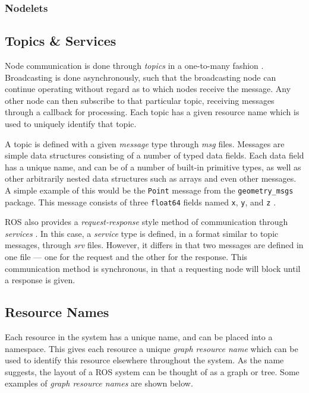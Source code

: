 \subsubsection{Nodelets}


\subsection{Topics \& Services}
Node communication is done through \emph{topics} in a one-to-many fashion \cite{ros_paper}. Broadcasting is done asynchronously, such that the broadcasting node can continue operating without regard as to which nodes receive the message. Any other node can then subscribe to that particular topic, receiving messages through a callback for processing. Each topic has a given resource name which is used to uniquely identify that topic.

A topic is defined with a given \emph{message} type through \emph{msg} files. Messages are simple data structures consisting of a number of typed data fields. Each data field has a unique name, and can be of a number of built-in primitive types, as well as other arbitrarily nested data structures such as arrays and even other messages. A simple example of this would be the \texttt{Point} message from the \texttt{geometry\_msgs} package. This message consists of three \texttt{float64} fields named \texttt{x}, \texttt{y}, and \texttt{z} \cite{ros_api_point_msg}.

ROS also provides a \emph{request-response} style method of communication through \emph{services} \cite{ros_wiki_services}. In this case, a \emph{service} type is defined, in a format similar to topic messages, through \emph{srv} files. However, it differs in that two messages are defined in one file --- one for the request and the other for the response. This communication method is synchronous, in that a requesting node will block until a response is given. 

\subsection{Resource Names}

Each resource in the system has a unique name, and can be placed into a namespace. This gives each resource a unique \emph{graph resource name} which can be used to identify this resource elsewhere throughout the system. As the name suggests, the layout of a ROS system can be thought of as a graph or tree. Some examples of \emph{graph resource names} are shown below.

